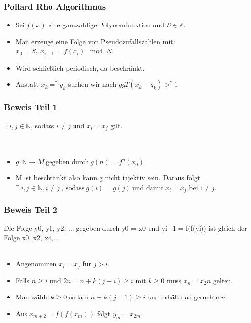\documentclass[mathserif, compress]{beamer}
\begin{document}
\begin{frame}
  \frametitle{Pollard Rho Algorithmus}
  \begin{itemize}
    \item<1-> Sei $f(x)$ eine ganzzahlige Polynomfunktion und $S \in \mathbb{Z}$.
     \vspace{3mm}
    \item<2-> Man erzeuge eine Folge von Pseudozufallszahlen mit:\\ $x_0= S, \ x_{i+1}=f(x_i)\mod N$.
    \vspace{3mm}
    \item<3-> Wird schlie\ss{}lich periodisch, da beschr\"ankt.
    \vspace{3mm}
    \item<4-> Anstatt $x_k=^?y_k$ suchen wir nach $ggT(x_k - y_k)>^? 1$
  \end{itemize}
\end{frame}

\begin{frame}
  \frametitle{Beweis Teil 1}
$\exists \ i,j \in \mathbb{N}$, sodass $i \not= j$ und $x_i = x_j$ gilt.\\
\ \\
\ \\
  \begin{itemize}
    \item<1->  $g:\mathbb{N} \rightarrow M \ \text{gegeben durch} \ g(n)=f^n(x_0)$
      \vspace{3mm}
    \item<2-> M ist beschr\"ankt also kann g nicht injektiv sein. Daraus folgt:\\
	      $\exists \ i,j \in \mathbb{N}, i\not=j \ \text{, sodass} \ g(i)=g(j) \ \text{und damit} \ x_i=x_j$ bei $i\not=j$.
  \end{itemize}
\end{frame}

\begin{frame}
  \frametitle{Beweis Teil 2}
Die Folge y0, y1, y2, ... gegeben durch y0 = x0 und
yi+1 = f(f(yi)) ist gleich der Folge x0, x2, x4,... \\
\ \\
  \begin{itemize}
    \item<1-> Angenommen $x_i=x_j$ f\"ur $j>i$.
     \vspace{3mm}
    \item<2-> Falls $n\geq i$ und $2n=n+k(j-i)\geq i$ mit $k\geq 0$ muss $x_n=x_2n$ gelten.
     \vspace{3mm}
    \item<3-> Man w\"ahle $k\geq 0$ sodass $n=k(j-1)\geq i$ und erh\"alt das gesuchte $n$.
     \vspace{3mm}
    \item<4-> Aus $x_{m+2}=f(f(x_m))$ folgt $y_m = x_{2m}$.
  \end{itemize}
\end{frame}
\end{document}
